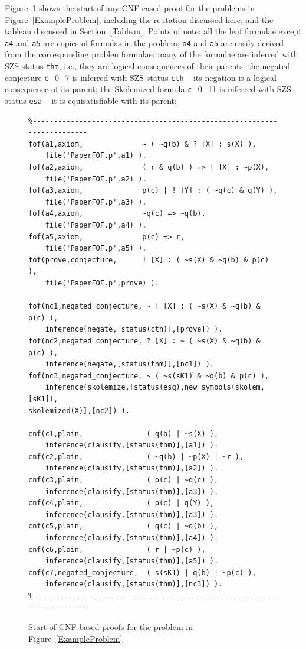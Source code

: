 \documentclass[runningheads]{llncs}
\newcommand{\smalltt}[1]{\small \texttt{#1}}
\begin{document}
Figure~\ref{ExampleClausification} shows the start of any CNF-cased proof for the problems
in Figure~\ref{ExampleProblem}, including the reutation discussed here, and the tableau
discussed in Section~\ref{Tableau}.
Points of note:
all the leaf formulae except {\tt a4} and {\tt a5} are copies of formulas in the problem;
{\tt a4} and {\tt a5} are easily derived from the corresponding problen formulae;
many of the formulae are inferred with SZS status {\smalltt{thm}}, i.e., they are logical 
consequences of their parents;
the negated conjecture {\smalltt c\_0\_7} is inferred with SZS status {\smalltt{cth}} --
its negation is a logical consequence of its parent;
the Skolemized formula {\smalltt c\_0\_11} is inferred with SZS status {\smalltt{esa}} --
it is equisatisfiable with its parent;

\begin{figure}[htb]
\centering
{\footnotesize
{\setlength{\baselineskip}{3mm}
\begin{verbatim}
%------------------------------------------------------------------------
fof(a1,axiom,              ~ ( ~q(b) & ? [X] : s(X) ),
    file('PaperFOF.p',a1) ).
fof(a2,axiom,              ( r & q(b) ) => ! [X] : ~p(X),
    file('PaperFOF.p',a2) ).
fof(a3,axiom,              p(c) | ! [Y] : ( ~q(c) & q(Y) ),
    file('PaperFOF.p',a3) ).
fof(a4,axiom,              ~q(c) => ~q(b),
    file('PaperFOF.p',a4) ).
fof(a5,axiom,              p(c) => r,
    file('PaperFOF.p',a5) ).
fof(prove,conjecture,      ! [X] : ( ~s(X) & ~q(b) & p(c) ),
    file('PaperFOF.p',prove) ).

fof(nc1,negated_conjecture, ~ ! [X] : ( ~s(X) & ~q(b) & p(c) ),
    inference(negate,[status(cth)],[prove]) ).
fof(nc2,negated_conjecture, ? [X] : ~ ( ~s(X) & ~q(b) & p(c) ),
    inference(negate,[status(thm)],[nc1]) ).
fof(nc3,negated_conjecture, ~ ( ~s(sK1) & ~q(b) & p(c) ),
    inference(skolemize,[status(esq),new_symbols(skolem,[sK1]),
skolemized(X)],[nc2]) ).

cnf(c1,plain,               ( q(b) | ~s(X) ),
    inference(clausify,[status(thm)],[a1]) ).
cnf(c2,plain,               ( ~q(b) | ~p(X) | ~r ),
    inference(clausify,[status(thm)],[a2]) ).
cnf(c3,plain,               ( p(c) | ~q(c) ),
    inference(clausify,[status(thm)],[a3]) ).
cnf(c4,plain,               ( p(c) | q(Y) ),
    inference(clausify,[status(thm)],[a3]) ).
cnf(c5,plain,               ( q(c) | ~q(b) ),
    inference(clausify,[status(thm)],[a4]) ).
cnf(c6,plain,               ( r | ~p(c) ),
    inference(clausify,[status(thm)],[a5]) ).
cnf(c7,negated_conjecture,  ( s(sK1) | q(b) | ~p(c) ),
    inference(clausify,[status(thm)],[nc3]) ).
%------------------------------------------------------------------------
\end{verbatim}
}}
\caption{Start of CNF-based proofs for the problem in Figure~\ref{ExampleProblem}}
\label{ExampleClausification}
\end{figure}
\end{document}
